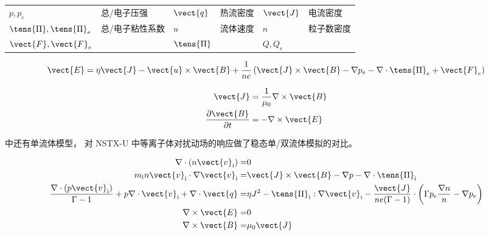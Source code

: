 \begin{table}[htb]
    \centering
    \label{tab:formula_double-fluid}
    \begin{tabularx}{\linewidth}{lXlXlX}
        $p,p_e$ &  总/电子压强 & $\vect{q}$ & 热流密度 & $\vect{J}$ & 电流密度\\
        $\tens{\Pi},\tens{\Pi}_e$ & 总/电子粘性系数 &$u$ & 流体速度 & $n$ & 粒子数密度 \\
        $\vect{F},\vect{F}_e$ & &$\tens{\Pi}$ & & $Q,Q_e$ & 
    \end{tabularx}
\end{table}

\begin{equation}
\vect{E}=\eta \vect{J}-\vect{u} \times \vect{B}+\frac{1}{n e}\left(\vect{J} \times \vect{B}-\nabla p_{e}-\nabla \cdot \tens{\Pi}_{e}+\vect{F}_{e}\right)\end{equation}

\begin{equation}\begin{aligned}
    \vect{J} &=\frac{1}{\mu_{0}} \nabla \times \vect{B} \\
    \frac{\partial \vect{B}}{\partial t} &=-\nabla \times \vect{E}
\end{aligned}\end{equation}

\mdddc 中还有单流体模型， \cite{canal_m3d-c1_2017} 对 NSTX-U 中等离子体对扰动场的响应做了稳态单/双流体模拟的对比。

\begin{equation}\begin{aligned}
    \nabla \cdot\left(n \vect{v}_{\mathrm{i}}\right)=&0\\
    m_{\mathrm{i}} n \vect{v}_{\mathrm{i}} \cdot \nabla \vect{v}_{\mathrm{i}}=&\vect{J} \times \vect{B}-\nabla p-\nabla \cdot \tens{\Pi}_{\mathrm{i}}\\
    \frac{\nabla \cdot\left(p \vect{v}_{\mathrm{i}}\right)}{\Gamma-1}+p \nabla \cdot \vect{v}_{\mathrm{i}}+\nabla \cdot \vect{q}=&\eta J^{2}-\tens{\Pi}_{\mathrm{i}}: \nabla \vect{v}_{\mathrm{i}}-\frac{\vect{J}}{n e(\Gamma-1)} \cdot\left(\Gamma p_{\mathrm{e}} \frac{\nabla n}{n}-\nabla p_{\mathrm{e}}\right)\\
    \nabla \times \vect{E}=&0\\
    \nabla \times \vect{B}=&\mu_{0} \vect{J}
\end{aligned}\end{equation}


